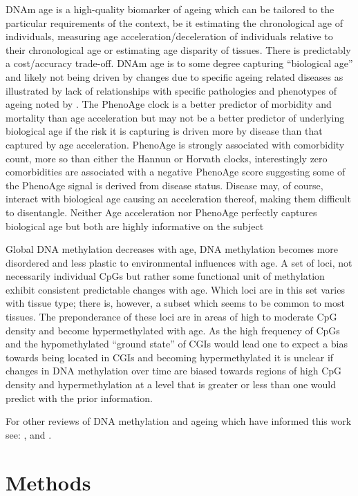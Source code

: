 \documentclass[]{book}
\begin{document}
DNAm age is a high-quality biomarker of ageing which can be tailored to the particular requirements of the context, be it estimating the chronological age of individuals, measuring age acceleration/deceleration of individuals relative to their chronological age or estimating age disparity of tissues. There is predictably a cost/accuracy trade-off. DNAm age is to some degree capturing ``biological age'' and likely not being driven by changes due to specific ageing related diseases as illustrated by lack of relationships with specific pathologies and phenotypes of ageing noted by \citet{Bell2012}. The PhenoAge clock is a better predictor of morbidity and mortality than age acceleration but may not be a better predictor of underlying biological age if the risk it is capturing is driven more by disease than that captured by age acceleration. PhenoAge is strongly associated with comorbidity count, more so than either the Hannun or Horvath clocks, interestingly zero comorbidities are associated with a negative PhenoAge score suggesting some of the PhenoAge signal is derived from disease status. Disease may, of course, interact with biological age causing an acceleration thereof, making them difficult to disentangle. Neither Age acceleration nor PhenoAge perfectly captures biological age but both are highly informative on the subject

Global DNA methylation decreases with age, DNA methylation becomes more disordered and less plastic to environmental influences with age. A set of loci, not necessarily individual CpGs but rather some functional unit of methylation exhibit consistent predictable changes with age. Which loci are in this set varies with tissue type; there is, however, a subset which seems to be common to most tissues. The preponderance of these loci are in areas of high to moderate CpG density and become hypermethylated with age. As the high frequency of CpGs and the hypomethylated ``ground state'' of CGIs would lead one to expect a bias towards being located in CGIs and becoming hypermethylated it is unclear if changes in DNA methylation over time are biased towards regions of high CpG density and hypermethylation at a level that is greater or less than one would predict with the prior information.

For other reviews of DNA methylation and ageing which have informed this work see: \citep{Jung2015}, \citep{Jones2015} and \citep{Horvath2018}.

\hypertarget{part-methods}{%
\part{Methods}\label{part-methods}}
\end{document}
